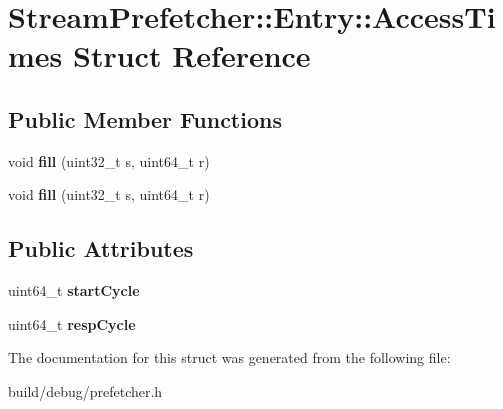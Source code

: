 \hypertarget{structStreamPrefetcher_1_1Entry_1_1AccessTimes}{\section{Stream\-Prefetcher\-:\-:Entry\-:\-:Access\-Times Struct Reference}
\label{structStreamPrefetcher_1_1Entry_1_1AccessTimes}
}
\subsection*{Public Member Functions}
\begin{DoxyCompactItemize}
\item 
\hypertarget{structStreamPrefetcher_1_1Entry_1_1AccessTimes_ab2d299ef0de5674ed3f10e1e33f11ba6}{void {\bfseries fill} (uint32\-\_\-t s, uint64\-\_\-t r)}\label{structStreamPrefetcher_1_1Entry_1_1AccessTimes_ab2d299ef0de5674ed3f10e1e33f11ba6}

\item 
\hypertarget{structStreamPrefetcher_1_1Entry_1_1AccessTimes_ab2d299ef0de5674ed3f10e1e33f11ba6}{void {\bfseries fill} (uint32\-\_\-t s, uint64\-\_\-t r)}\label{structStreamPrefetcher_1_1Entry_1_1AccessTimes_ab2d299ef0de5674ed3f10e1e33f11ba6}

\end{DoxyCompactItemize}
\subsection*{Public Attributes}
\begin{DoxyCompactItemize}
\item 
\hypertarget{structStreamPrefetcher_1_1Entry_1_1AccessTimes_a5d53e5883288b72f7958aaa4bf36b1be}{uint64\-\_\-t {\bfseries start\-Cycle}}\label{structStreamPrefetcher_1_1Entry_1_1AccessTimes_a5d53e5883288b72f7958aaa4bf36b1be}

\item 
\hypertarget{structStreamPrefetcher_1_1Entry_1_1AccessTimes_a5af85d4482dfd85f6804a1d290d43ab7}{uint64\-\_\-t {\bfseries resp\-Cycle}}\label{structStreamPrefetcher_1_1Entry_1_1AccessTimes_a5af85d4482dfd85f6804a1d290d43ab7}

\end{DoxyCompactItemize}


The documentation for this struct was generated from the following file\-:\begin{DoxyCompactItemize}
\item 
build/debug/prefetcher.\-h\end{DoxyCompactItemize}
